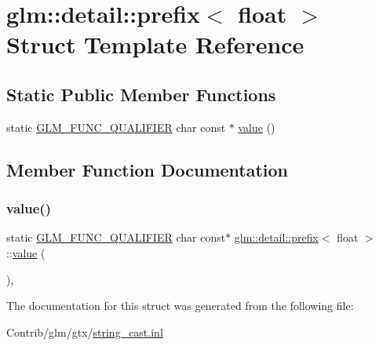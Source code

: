 \hypertarget{structglm_1_1detail_1_1prefix_3_01float_01_4}{}\section{glm\+:\+:detail\+:\+:prefix$<$ float $>$ Struct Template Reference}
\label{structglm_1_1detail_1_1prefix_3_01float_01_4}
\subsection*{Static Public Member Functions}
\begin{DoxyCompactItemize}
\item 
static \mbox{\hyperlink{setup_8hpp_a33fdea6f91c5f834105f7415e2a64407}{G\+L\+M\+\_\+\+F\+U\+N\+C\+\_\+\+Q\+U\+A\+L\+I\+F\+I\+ER}} char const  $\ast$ \mbox{\hyperlink{structglm_1_1detail_1_1prefix_3_01float_01_4_a106cde8d6d62001a05cbf21367467591}{value}} ()
\end{DoxyCompactItemize}


\subsection{Member Function Documentation}
\mbox{\label{structglm_1_1detail_1_1prefix_3_01float_01_4_a106cde8d6d62001a05cbf21367467591}} 
\subsubsection{\texorpdfstring{value()}{value()}}
{\footnotesize\ttfamily static \mbox{\hyperlink{setup_8hpp_a33fdea6f91c5f834105f7415e2a64407}{G\+L\+M\+\_\+\+F\+U\+N\+C\+\_\+\+Q\+U\+A\+L\+I\+F\+I\+ER}} char const$\ast$ \mbox{\hyperlink{structglm_1_1detail_1_1prefix}{glm\+::detail\+::prefix}}$<$ float $>$\+::\mbox{\hyperlink{_s_d_l__opengl__glext_8h_a8ad81492d410ff2ac11f754f4042150f}{value}} (\begin{DoxyParamCaption}{ }\end{DoxyParamCaption})\hspace{0.3cm}{\ttfamily [inline]}, {\ttfamily [static]}}



The documentation for this struct was generated from the following file\+:\begin{DoxyCompactItemize}
\item 
Contrib/glm/gtx/\mbox{\hyperlink{string__cast_8inl}{string\+\_\+cast.\+inl}}\end{DoxyCompactItemize}
